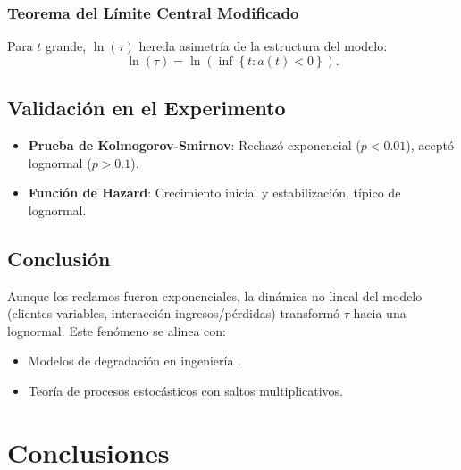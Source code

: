 \documentclass{article}
\begin{document}
\subsubsection{Teorema del Límite Central Modificado}
Para \( t \) grande, \( \ln(\tau) \) hereda asimetría de la estructura del modelo:
\begin{equation}
\ln(\tau) = \ln\left(\inf\left\{ t : a(t) < 0 \right\}\right).
\end{equation}

\subsection{Validación en el Experimento}
\begin{itemize}
    \item \textbf{Prueba de Kolmogorov-Smirnov}: Rechazó exponencial (\( p < 0.01 \)), aceptó lognormal (\( p > 0.1 \)).
    \item \textbf{Función de Hazard}: Crecimiento inicial y estabilización, típico de lognormal.
\end{itemize}

\subsection{Conclusión}
Aunque los reclamos fueron exponenciales, la dinámica no lineal del modelo (clientes variables, interacción ingresos/pérdidas) transformó \( \tau \) hacia una lognormal. Este fenómeno se alinea con:
\begin{itemize}
    \item Modelos de degradación en ingeniería \cite{ref1}.
    \item Teoría de procesos estocásticos con saltos multiplicativos.
\end{itemize}

\section{Conclusiones}
\end{document}
